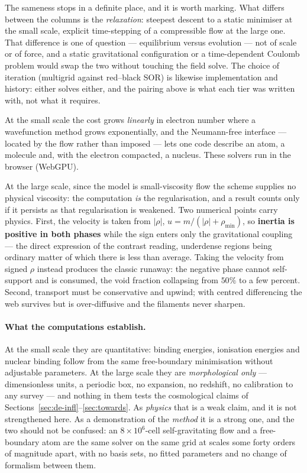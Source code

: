 \documentclass[11pt]{article}
\begin{document}
The sameness stops in a definite place, and it is worth marking. What differs between the columns is the
\emph{relaxation}: steepest descent to a static minimiser at the small scale, explicit time-stepping of a
compressible flow at the large one. That difference is one of question --- equilibrium versus evolution --- not of
scale or of force, and a static gravitational configuration or a time-dependent Coulomb problem would swap the two
without touching the field solve. The choice of iteration (multigrid against red--black SOR) is likewise
implementation and history: either solves either, and the pairing above is what each tier was written with, not
what it requires.

At the small scale the cost grows \emph{linearly} in electron number where a wavefunction method grows
exponentially, and the Neumann-free interface --- located by the flow rather than imposed --- lets one code
describe an atom, a molecule and, with the electron compacted, a nucleus. These solvers run in the browser
(WebGPU).

At the large scale, since the model is small-viscosity flow the scheme supplies no physical viscosity: the
computation \emph{is} the regularisation, and a result counts only if it persists as that regularisation is
weakened. Two numerical points carry physics. First, the velocity is taken from $|\rho|$,
$u=m/(|\rho|+\rho_{\min})$, so \textbf{inertia is positive in both phases} while the sign enters only the
gravitational coupling --- the direct expression of the contrast reading, underdense regions being ordinary matter
of which there is less than average. Taking the velocity from signed $\rho$ instead produces the classic runaway:
the negative phase cannot self-support and is consumed, the void fraction collapsing from $50\%$ to a few percent.
Second, transport must be conservative and upwind; with centred differencing the web survives but is
over-diffusive and the filaments never sharpen.

\paragraph{What the computations establish.} At the small scale they are quantitative: binding energies, ionisation
energies and nuclear binding follow from the same free-boundary minimisation without adjustable parameters. At the
large scale they are \emph{morphological only} --- dimensionless units, a periodic box, no expansion, no redshift,
no calibration to any survey --- and nothing in them tests the cosmological claims of
Sections~\ref{sec:de-infl}--\ref{sec:towards}. As \emph{physics} that is a weak claim, and it is not strengthened
here. As a demonstration of the \emph{method} it is a strong one, and the two should not be confused: an $8\times
10^6$-cell self-gravitating flow and a free-boundary atom are the same solver on the same grid at scales some
forty orders of magnitude apart, with no basis sets, no fitted parameters and no change of formalism between
them.
\end{document}

